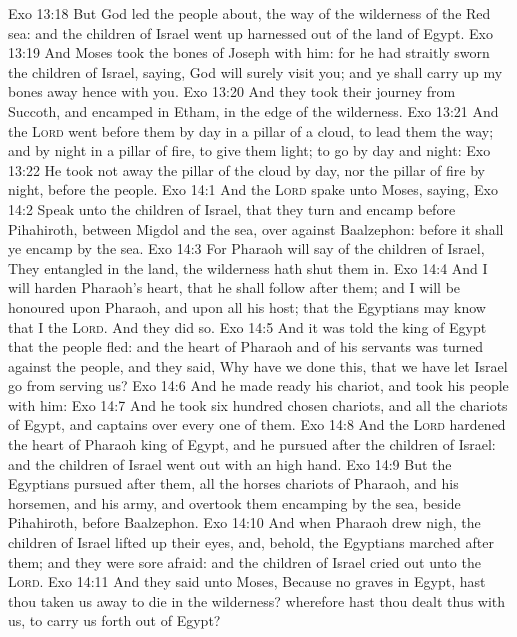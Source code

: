 \vs Exo 13:18 But God led the people about,  the way of the wilderness of the Red sea: and the children of Israel went up harnessed out of the land of Egypt.
\vs Exo 13:19 And Moses took the bones of Joseph with him: for he had straitly sworn the children of Israel, saying, God will surely visit you; and ye shall carry up my bones away hence with you.
\vs Exo 13:20 And they took their journey from Succoth, and encamped in Etham, in the edge of the wilderness.
\vs Exo 13:21 And the \textsc{Lord} went before them by day in a pillar of a cloud, to lead them the way; and by night in a pillar of fire, to give them light; to go by day and night:
\vs Exo 13:22 He took not away the pillar of the cloud by day, nor the pillar of fire by night,  before the people.
\vs Exo 14:1 And the \textsc{Lord} spake unto Moses, saying,
\vs Exo 14:2 Speak unto the children of Israel, that they turn and encamp before Pihahiroth, between Migdol and the sea, over against Baalzephon: before it shall ye encamp by the sea.
\vs Exo 14:3 For Pharaoh will say of the children of Israel, They  entangled in the land, the wilderness hath shut them in.
\vs Exo 14:4 And I will harden Pharaoh's heart, that he shall follow after them; and I will be honoured upon Pharaoh, and upon all his host; that the Egyptians may know that I  the \textsc{Lord}. And they did so.
\vs Exo 14:5 And it was told the king of Egypt that the people fled: and the heart of Pharaoh and of his servants was turned against the people, and they said, Why have we done this, that we have let Israel go from serving us?
\vs Exo 14:6 And he made ready his chariot, and took his people with him:
\vs Exo 14:7 And he took six hundred chosen chariots, and all the chariots of Egypt, and captains over every one of them.
\vs Exo 14:8 And the \textsc{Lord} hardened the heart of Pharaoh king of Egypt, and he pursued after the children of Israel: and the children of Israel went out with an high hand.
\vs Exo 14:9 But the Egyptians pursued after them, all the horses  chariots of Pharaoh, and his horsemen, and his army, and overtook them encamping by the sea, beside Pihahiroth, before Baalzephon.
\vs Exo 14:10 And when Pharaoh drew nigh, the children of Israel lifted up their eyes, and, behold, the Egyptians marched after them; and they were sore afraid: and the children of Israel cried out unto the \textsc{Lord}.
\vs Exo 14:11 And they said unto Moses, Because  no graves in Egypt, hast thou taken us away to die in the wilderness? wherefore hast thou dealt thus with us, to carry us forth out of Egypt?
